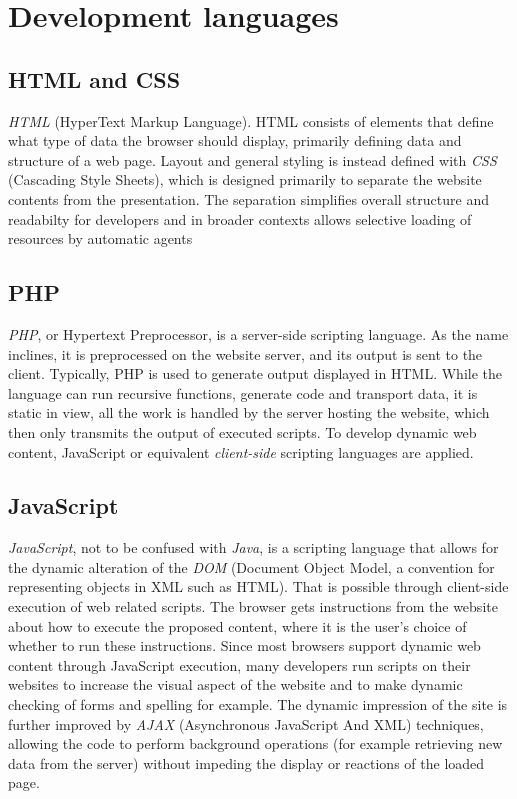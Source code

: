 \section{Development languages}

\subsection{HTML and CSS}
\label{program_tools_html_css}
\emph{HTML} (HyperText Markup Language). HTML consists of elements that define what type of data the browser should display, primarily defining data and structure of a web page. Layout and general styling is instead defined with \emph{CSS} (Cascading Style Sheets), which is designed primarily to separate the website contents from the presentation.
The separation simplifies overall structure and readabilty for developers and in broader contexts allows selective loading of resources by automatic agents\cite{html}\cite{css}

\subsection{PHP}
\emph{PHP}, or Hypertext Preprocessor, is a server-side scripting language. As the name inclines, it is preprocessed on the website server, and its output is sent to the client. Typically, PHP is used to generate output displayed in HTML. While the language can run recursive functions, generate code and transport data, it is static in view, all the work is handled by the server hosting the website, which then only transmits the output of executed scripts. To develop dynamic web content, JavaScript or equivalent \emph{client-side} scripting languages are applied.\cite{php}

\subsection{JavaScript}
\emph{JavaScript}, not to be confused with \emph{Java}, is a scripting language that allows for the dynamic alteration of the \emph{DOM} (Document Object Model, a convention for representing objects in XML such as HTML). That is possible through client-side execution of web related scripts. The browser gets instructions from the website about how to execute the proposed content, where it is the user's choice of whether to run these instructions.
Since most browsers support dynamic web content through JavaScript execution, many developers run scripts on their websites to increase the visual aspect of the website and to make dynamic checking of forms and spelling for example.\cite{javascript} The dynamic impression of the site is further improved by \emph{AJAX} (Asynchronous JavaScript And XML) techniques, allowing the code to perform background operations (for example retrieving new data from the server) without impeding the display or reactions of the loaded page.

